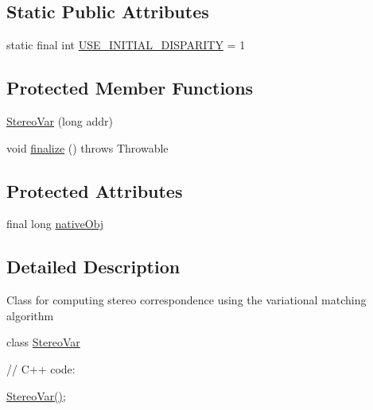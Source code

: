 \subsection*{Static Public Attributes}
\begin{DoxyCompactItemize}
\item 
static final int \mbox{\hyperlink{classorg_1_1opencv_1_1contrib_1_1_stereo_var_a9a2dd08760a421639b13ccb4443b14f3}{U\+S\+E\+\_\+\+I\+N\+I\+T\+I\+A\+L\+\_\+\+D\+I\+S\+P\+A\+R\+I\+TY}} = 1
\end{DoxyCompactItemize}
\subsection*{Protected Member Functions}
\begin{DoxyCompactItemize}
\item 
\mbox{\hyperlink{classorg_1_1opencv_1_1contrib_1_1_stereo_var_a2fefe4ed9e2c7f8a32f6332c0f80c90f}{Stereo\+Var}} (long addr)
\item 
void \mbox{\hyperlink{classorg_1_1opencv_1_1contrib_1_1_stereo_var_ac41167137d012929d79bc53d73f11829}{finalize}} ()  throws Throwable 
\end{DoxyCompactItemize}
\subsection*{Protected Attributes}
\begin{DoxyCompactItemize}
\item 
final long \mbox{\hyperlink{classorg_1_1opencv_1_1contrib_1_1_stereo_var_a68a385e26277081547408bba0290151d}{native\+Obj}}
\end{DoxyCompactItemize}


\subsection{Detailed Description}
Class for computing stereo correspondence using the variational matching algorithm

class \mbox{\hyperlink{classorg_1_1opencv_1_1contrib_1_1_stereo_var}{Stereo\+Var}} {\ttfamily }

{\ttfamily }

{\ttfamily }

{\ttfamily // C++ code\+:}

{\ttfamily }

{\ttfamily }

{\ttfamily \mbox{\hyperlink{classorg_1_1opencv_1_1contrib_1_1_stereo_var_a41e4ac2c35cc18a53955d6d3bb847009}{Stereo\+Var()}};}

